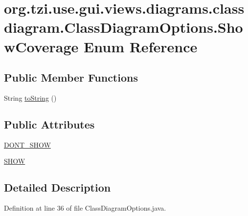 \hypertarget{enumorg_1_1tzi_1_1use_1_1gui_1_1views_1_1diagrams_1_1classdiagram_1_1_class_diagram_options_1_1_show_coverage}{\section{org.\-tzi.\-use.\-gui.\-views.\-diagrams.\-classdiagram.\-Class\-Diagram\-Options.\-Show\-Coverage Enum Reference}
\label{enumorg_1_1tzi_1_1use_1_1gui_1_1views_1_1diagrams_1_1classdiagram_1_1_class_diagram_options_1_1_show_coverage}
}
\subsection*{Public Member Functions}
\begin{DoxyCompactItemize}
\item 
String \hyperlink{enumorg_1_1tzi_1_1use_1_1gui_1_1views_1_1diagrams_1_1classdiagram_1_1_class_diagram_options_1_1_show_coverage_abbe91f643c73e1daedbd99e87c3226f5}{to\-String} ()
\end{DoxyCompactItemize}
\subsection*{Public Attributes}
\begin{DoxyCompactItemize}
\item 
\hyperlink{enumorg_1_1tzi_1_1use_1_1gui_1_1views_1_1diagrams_1_1classdiagram_1_1_class_diagram_options_1_1_show_coverage_a0a525dcac0a887161a1838c6f96c5b16}{D\-O\-N\-T\-\_\-\-S\-H\-O\-W}
\item 
\hyperlink{enumorg_1_1tzi_1_1use_1_1gui_1_1views_1_1diagrams_1_1classdiagram_1_1_class_diagram_options_1_1_show_coverage_a14f7296cc22c5ce15cef0c7ee5d95530}{S\-H\-O\-W}
\end{DoxyCompactItemize}


\subsection{Detailed Description}


Definition at line 36 of file Class\-Diagram\-Options.\-java.



